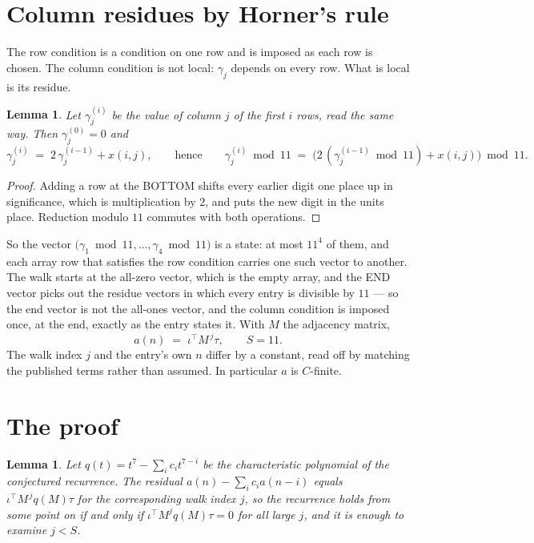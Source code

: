 \documentclass[11pt,a4paper]{article}
\theoremstyle{plain}
\newtheorem{lemma}[theorem]{Lemma}
\theoremstyle{definition}
\begin{document}
\section{Column residues by Horner's rule}

The row condition is a condition on one row and is imposed as each row is chosen. The column
condition is not local: $\gamma_j$ depends on every row. What is local is its residue.

\begin{lemma}\label{lem:horner}
Let $\gamma_j^{(i)}$ be the value of column $j$ of the first $i$ rows, read the same way.
Then $\gamma_j^{(0)}=0$ and
\[
\gamma_j^{(i)}\;=\;2\,\gamma_j^{(i-1)}+x(i,j),
\qquad\text{hence}\qquad
\gamma_j^{(i)}\bmod 11\;=\;
\bigl(2\,(\gamma_j^{(i-1)}\bmod 11)+x(i,j)\bigr)\bmod 11 .
\]
\end{lemma}

\begin{proof}
Adding a row at the BOTTOM shifts every earlier digit one place up in significance, which is
multiplication by $2$, and puts the new digit in the units place. Reduction modulo
$11$ commutes with both operations.
\end{proof}

So the vector $\bigl(\gamma_1\bmod 11,\dots,\gamma_{4}\bmod
11\bigr)$ is a state: at most $11^{4}$ of them, and each array row
that satisfies the row condition carries one such vector to another. The walk starts at the
all-zero vector, which is the empty array, and the END vector picks out the residue vectors in
which every entry is divisible by $11$ --- so the end vector is not the all-ones
vector, and the column condition is imposed once, at the end, exactly as the entry states it.
With $M$ the adjacency matrix,
\[
a(n)\;=\;\iota^{\!\top}M^{\,j}\tau ,\qquad S=11.
\]
The walk index $j$ and the entry's own $n$ differ by a constant, read off by matching the
published terms rather than assumed. In particular $a$ is $C$-finite.

\section{The proof}

\begin{lemma}\label{lem:crit}
Let $q(t)=t^{7}-\sum_i c_it^{7-i}$ be the characteristic polynomial of the
conjectured recurrence. The residual $a(n)-\sum_ic_ia(n-i)$ equals
$\iota^{\!\top}M^{\,j}q(M)\tau$ for the corresponding walk index $j$, so the recurrence
holds from some point on if and only if $\iota^{\!\top}M^{j}q(M)\tau=0$ for all large $j$,
and it is enough to examine $j<S$.
\end{lemma}
\end{document}
